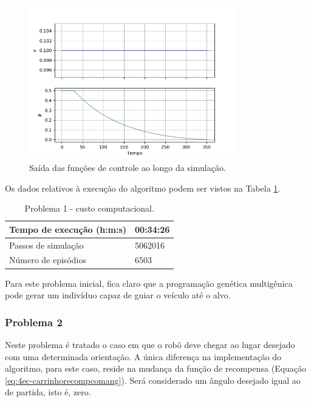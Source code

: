 \begin{figure}[H]
	\centering
	\includegraphics[width=0.8\textwidth]{02_desenvolvimento/04_EC_Fig_CarrinhoProb1VarGraf.png}
	\caption{Saída das funções de controle ao longo da simulação.}
	\label{fig:4ec-carrinhoprob1vargraf}
\end{figure}

Os dados relativos à execução do algoritmo podem ser vistos na Tabela \ref{tab:4ec-carrinhoprob1custocomp}.

\begin{table}[H]
	\centering
	\begin{tabular}{l|l} \toprule
		{{Tempo de execução (h:m:s)}} & {00:34:26} \\\midrule
		{{Passos de simulação}} & {5062016} \\\midrule
		{{Número de episódios}} & {6503} \\
		\bottomrule
	\end{tabular}
	\caption{Problema 1 - custo computacional.}\label{tab:4ec-carrinhoprob1custocomp}
\end{table}

Para este problema inicial, fica claro que a programação genética multigênica pode gerar um indivíduo capaz de guiar o veículo até o alvo.

\subsubsection{Problema 2}\label{sssec:4ec-carrinhoprob2}

Neste problema é tratado o caso em que o robô deve chegar ao lugar desejado com uma determinada orientação. A única diferença na implementação do algoritmo, para este caso, reside na mudança da função de recompensa (Equação \ref{eq:4ec-carrinhorecompcomang}). Será considerado um ângulo desejado igual ao de partida, isto é, zero.

